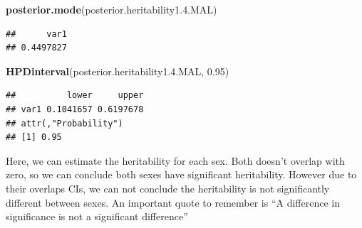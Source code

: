 \documentclass[
  12pt,
]{book}
\newenvironment{Shaded}{\begin{snugshade}}{\end{snugshade}}
\newcommand{\FloatTok}[1]{\textcolor[rgb]{0.00,0.00,0.81}{#1}}
\newcommand{\KeywordTok}[1]{\textcolor[rgb]{0.13,0.29,0.53}{\textbf{#1}}}
\newcommand{\NormalTok}[1]{#1}
\begin{document}
\begin{Shaded}
\begin{Highlighting}[]
\KeywordTok{posterior.mode}\NormalTok{(posterior.heritability1.}\FloatTok{4.}\NormalTok{MAL)}
\end{Highlighting}
\end{Shaded}

\begin{verbatim}
##      var1 
## 0.4497827
\end{verbatim}

\begin{Shaded}
\begin{Highlighting}[]
\KeywordTok{HPDinterval}\NormalTok{(posterior.heritability1.}\FloatTok{4.}\NormalTok{MAL, }\FloatTok{0.95}\NormalTok{)}
\end{Highlighting}
\end{Shaded}

\begin{verbatim}
##          lower     upper
## var1 0.1041657 0.6197678
## attr(,"Probability")
## [1] 0.95
\end{verbatim}

Here, we can estimate the heritability for each sex. Both doesn't overlap with zero, so we can conclude both sexes have significant heritability. However due to their overlaps CIs, we can not conclude the heritability is not significantly different between sexes.
An important quote to remember is ``A difference in significance is not a significant difference''
\end{document}
